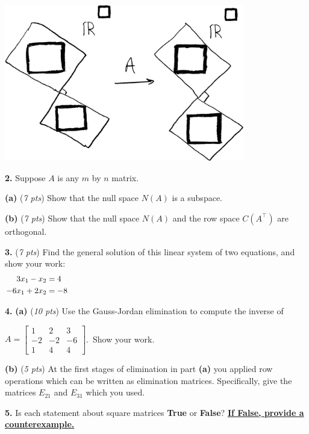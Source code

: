 \documentclass[11pt]{amsart}
\newcommand{\ds}{\displaystyle}
\newcommand{\prob}[1]{\bigskip\noindent\textbf{#1.} }
\newcommand{\pts}[1]{(\emph{#1 pts})}
\newcommand{\probpts}[2]{\prob{#1} \pts{#2} \quad}
\newcommand{\ppartpts}[2]{\textbf{(#1)} \pts{#2} \quad}
\newcommand{\epartpts}[2]{\medskip\noindent \textbf{(#1)} \pts{#2} \quad}
\begin{document}
\vspace{-35mm}
\hfill
\includegraphics[height=2.7in]{figs/big-pic-by-hand.jpg}


\clearpage \newpage
\prob{2}  Suppose $A$ is any $m$ by $n$ matrix.

\epartpts{a}{7}  Show that the null space $N(A)$ is a subspace.
\vfill

\epartpts{b}{7}  Show that the null space $N(A)$ and the row space $C(A^\top)$ are orthogonal.
\vfill

\probpts{3}{7}  Find the general solution of this linear system of two equations, and show your work:
\begin{align*}
3 x_1 - x_2 &= 4 && \hspace{4.0in} \\
-6 x_1 + 2 x_2 &= -8
\end{align*}
\vfill


\clearpage \newpage
\prob{4} \ppartpts{a}{10}  Use the Gauss-Jordan elimination to compute the inverse of

\medskip
\noindent $\ds A = \begin{bmatrix} 1 & 2 & 3 \\ -2 & -2 & -6 \\ 1 & 4 & 4 \end{bmatrix}$.  \,Show your work.
\vfill

\epartpts{b}{5}  At the first stages of elimination in part \textbf{(a)} you applied row operations which can be written as elimination matrices.  Specifically, give the matrices $E_{21}$ and $E_{31}$ which you used.
\vspace{2.0in}


\clearpage \newpage
\prob{5}  Is each statement about square matrices \textbf{True} or \textbf{False}?  \underline{\textbf{If False, provide a counterexample.}}
\end{document}
